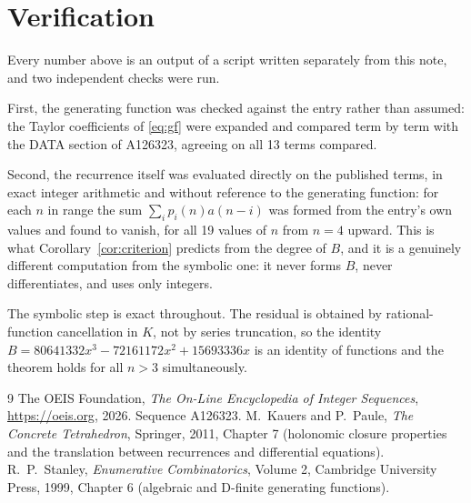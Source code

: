 \documentclass[11pt,a4paper]{article}
\theoremstyle{plain}
\theoremstyle{definition}
\begin{document}
\section{Verification}

Every number above is an output of a script written separately from this note, and two
independent checks were run.

First, the generating function was checked against the entry rather than assumed: the
Taylor coefficients of \eqref{eq:gf} were expanded and compared term by term with the DATA
section of A126323, agreeing on all 13 terms compared.

Second, the recurrence itself was evaluated directly on the published terms, in exact
integer arithmetic and without reference to the generating function: for each $n$ in range
the sum $\sum_{i}p_{i}(n)a(n-i)$ was formed from the entry's own values and found to
vanish, for all 19 values of $n$ from $n=4$ upward. This is what
Corollary~\ref{cor:criterion} predicts from the degree of $B$, and it is a genuinely
different computation from the symbolic one: it never forms $B$, never differentiates, and
uses only integers.

The symbolic step is exact throughout. The residual is obtained by rational-function
cancellation in $K$, not by series truncation, so the identity $B=80641332 x^{3} - 72161172 x^{2} + 15693336 x$ is an
identity of functions and the theorem holds for all $n>3$ simultaneously.

\begin{thebibliography}{9}
 The OEIS Foundation, \emph{The On-Line Encyclopedia of Integer Sequences},
\url{https://oeis.org}, 2026. Sequence A126323.
 M.~Kauers and P.~Paule, \emph{The Concrete Tetrahedron}, Springer, 2011,
Chapter 7 (holonomic closure properties and the translation between recurrences and
differential equations).
 R.~P.~Stanley, \emph{Enumerative Combinatorics}, Volume 2, Cambridge
University Press, 1999, Chapter 6 (algebraic and D-finite generating functions).
\end{thebibliography}
\end{document}
